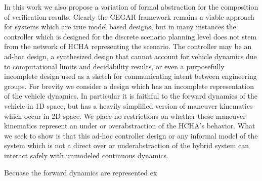 In this work we also propose a variation of formal abstraction for the composition of verification results. Clearly the CEGAR framework remains a viable approach for systems which are true model based designs, but in many instances the controller which is designed for the discrete scenario planning level does not stem from the network of HCHA representing the scenario. The controller may be an ad-hoc design, a synthesized design that cannot account for vehicle dynamics due to computational limits and decidability results, or even a purposefully incomplete design used as a sketch for communicating intent between engineering groups. 
For brevity we consider a design which has an incomplete representation of the vehicle dynamics. In particular it is faithful to the forward dynamics of the vehicle in 1D space, but has a heavily simplified version of maneuver kinematics which occur in 2D space. We place no restrictions on whether these maneuver kinematics represent an under or overabstraction of the HCHA's behavior. What we seek to show is that this ad-hoc controller design or any informal model of the system which is not a direct over or underabstraction of the hybrid system can interact safely with unmodeled continuous dynamics.

Becuase the forward dynamics are represented ex




